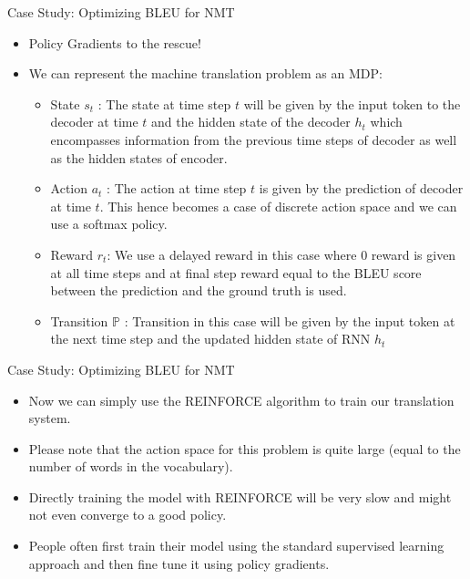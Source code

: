 \begin{frame}{Case Study: Optimizing BLEU for NMT}
    \begin{itemize}
        \item Policy Gradients to the rescue!
        \item We can represent the machine translation problem as an MDP:
            \begin{itemize}
                \item State $s_t$ : The state at time step $t$ will be given by the input token to the decoder at time $t$ and the hidden state of the decoder $h_t$ which encompasses information from the previous time steps of decoder as well as the hidden states of encoder.
                \item Action $a_t$ : The action at time step $t$ is given by the prediction of decoder at time $t$. This hence becomes a case of discrete action space and we can use a softmax policy.
                \item Reward $r_t$: We use a delayed reward in this case where 0 reward is given at all time steps and at final step reward equal to the BLEU score between the prediction and the ground truth is used.
                \item Transition $\mathbb{P}$ : Transition in this case will be given by the input token at the next time step and the updated hidden state of RNN $h_t$
            \end{itemize}
    \end{itemize}
\end{frame}

\begin{frame}{Case Study: Optimizing BLEU for NMT}
    \begin{itemize}
        \item Now we can simply use the REINFORCE algorithm to train our translation system.
        \item Please note that the action space for this problem is quite large (equal to the number of words in the vocabulary).
        \item Directly training the model with REINFORCE will be very slow and might not even converge to a good policy.
        \item People often first train their model using the standard supervised learning approach and then fine tune it using policy gradients.
    \end{itemize}
\end{frame}